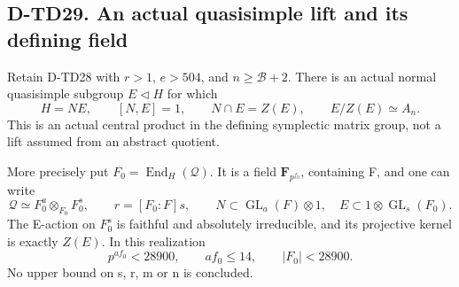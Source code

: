 \subsection*{D-TD29. An actual quasisimple lift and its defining field}

\begin{theorem}[D-TD29]
Retain D-TD28 with \(r>1\), \(e>504\), and
\(n\ge\mathcal B+2\).  There is an actual normal quasisimple
subgroup \(E\lhd H\) for which
\[
 H=NE,\qquad [N,E]=1,\qquad
 N\cap E=Z(E),\qquad E/Z(E)\simeq A_n.
 \tag{TDM.11}
\]
This is an actual central product in the defining symplectic
matrix group, not a lift assumed from an abstract quotient.

More precisely put \(F_0=\operatorname{End}_H(\mathcal Q)\).
It is a field \(\mathbf F_{p^{f_0}}\), containing F, and one
can write
\[
 \mathcal Q\simeq F_0^a\otimes_{F_0}F_0^s,
 \qquad r=[F_0:F]s,
 \qquad
 N\subset\operatorname{GL}_a(F)\otimes1,
 \quad E\subset1\otimes\operatorname{GL}_s(F_0).
 \tag{TDM.12}
\]
The E-action on \(F_0^s\) is faithful and absolutely irreducible,
and its projective kernel is exactly \(Z(E)\).  In this realization
\[
 p^{a f_0}<28900,
 \qquad a f_0\le14,
 \qquad |F_0|<28900.
 \tag{TDM.13}
\]
No upper bound on s, r, m or n is concluded.
\end{theorem}

